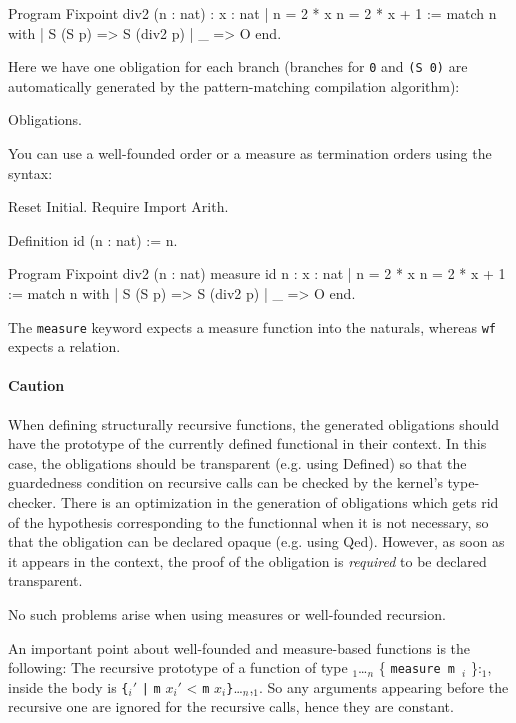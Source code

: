 \begin{coq_example}
Program Fixpoint div2 (n : nat) : { x : nat | n = 2 * x \/ n = 2 * x + 1 } :=
  match n with
  | S (S p) => S (div2 p)
  | _ => O
  end.
\end{coq_example}

Here we have one obligation for each branch (branches for \verb:0: and \verb:(S 0): are
automatically generated by the pattern-matching compilation algorithm):
\begin{coq_example}
  Obligations.
\end{coq_example}

You can use a well-founded order or a measure as termination orders using the syntax:
\begin{coq_eval}
Reset Initial.
Require Import Arith.
\end{coq_eval}
\begin{coq_example}
Definition id (n : nat) := n.

Program Fixpoint div2 (n : nat) {measure id n} : { x : nat | n = 2 * x \/ n = 2 * x + 1 } :=
  match n with
  | S (S p) => S (div2 p)
  | _ => O
  end.
\end{coq_example}

The \verb|measure| keyword expects a measure function into the naturals, whereas
\verb|wf| expects a relation.

\paragraph{Caution}
When defining structurally recursive functions, the
generated obligations should have the prototype of the currently defined functional
in their context. In this case, the obligations should be transparent
(e.g. using Defined) so that the guardedness condition on
recursive calls can be checked by the
kernel's type-checker. There is an optimization in the generation of
obligations which gets rid of the hypothesis corresponding to the
functionnal when it is not necessary, so that the obligation can be
declared opaque (e.g. using Qed). However, as soon as it appears in the
context, the proof of the obligation is \emph{required} to be declared transparent.

No such problems arise when using measures or well-founded recursion.

An important point about well-founded and measure-based functions is the following:
The recursive prototype of a function of type
{\binder$_1$}\ldots{\binder$_n$} \{ {\tt measure m \binder$_i$} \}:{\type$_1$}, 
inside the body is
\verb|{|{\binder$_i'$ \verb$|$ {\tt m} $x_i'$ < {\tt m} $x_i$}\verb|}|\ldots{\binder$_n$},{\type$_1$}. 
So any arguments appearing before the recursive one are ignored for the
recursive calls, hence they are constant.

